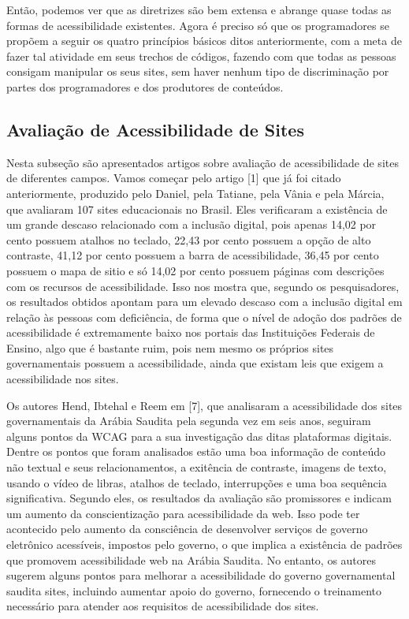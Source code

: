 \documentclass[a4paper]{article}
\begin{document}
\begin{titlepage}
Então, podemos ver que as diretrizes são bem extensa e abrange quase todas as formas de acessibilidade existentes. Agora é preciso só que os programadores se propõem a seguir os quatro princípios básicos ditos anteriormente, com a meta de fazer tal atividade em seus trechos de códigos, fazendo com que todas as pessoas consigam manipular os seus sites, sem haver nenhum tipo de discriminação por partes dos programadores e dos produtores de conteúdos.

\subsection{Avaliação de Acessibilidade de Sites}
Nesta subseção são apresentados artigos sobre avaliação de acessibilidade de sites de diferentes campos.  Vamos começar pelo artigo [1] que já foi citado anteriormente, produzido pelo Daniel, pela Tatiane, pela Vânia e pela Márcia, que avaliaram 107 sites educacionais no Brasil. Eles verificaram a existência de um grande descaso relacionado com a inclusão digital, pois apenas 14,02 por cento possuem atalhos no teclado, 22,43 por cento possuem a opção de alto contraste, 41,12 por cento possuem a barra de acessibilidade, 36,45 por cento possuem o mapa de sitio e só 14,02 por cento possuem páginas com descrições com os recursos de acessibilidade. Isso nos mostra que, segundo os pesquisadores, os resultados obtidos apontam para um elevado descaso com a inclusão digital em relação às pessoas com deficiência, de forma que o nível de adoção dos padrões de acessibilidade é extremamente baixo nos portais das Instituições Federais de Ensino, algo que é bastante ruim, pois nem mesmo os próprios sites governamentais possuem a acessibilidade, ainda que existam leis que exigem a acessibilidade nos sites.

Os autores Hend, Ibtehal e Reem em [7], que analisaram a acessibilidade dos sites governamentais da Arábia Saudita pela segunda vez em seis anos, seguiram alguns pontos da WCAG para a sua investigação das ditas plataformas digitais. Dentre os pontos que foram analisados estão uma boa informação de conteúdo não textual e seus relacionamentos, a exitência de contraste, imagens de texto, usando o vídeo de libras, atalhos de teclado, interrupções e uma boa sequência significativa. Segundo eles, os resultados da avaliação são promissores e indicam um aumento da conscientização para acessibilidade da web. Isso pode ter acontecido pelo aumento da consciência de desenvolver serviços de governo eletrônico acessíveis, impostos pelo governo, o que implica a existência de padrões que promovem acessibilidade web na Arábia Saudita. No entanto, os autores sugerem alguns pontos para melhorar a acessibilidade do governo governamental saudita sites, incluindo aumentar apoio do governo, fornecendo o treinamento necessário para atender aos requisitos de acessibilidade dos sites.


\end{titlepage}
\end{document}
